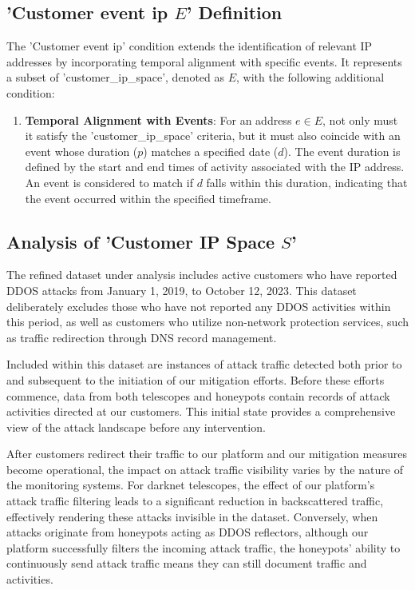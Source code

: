 \subsection{'Customer event ip $E$' Definition}
The 'Customer event ip' condition extends the identification of relevant IP addresses by incorporating temporal alignment with specific events. It represents a subset of 'customer\_ip\_space', denoted as $E$, with the following additional condition:

\begin{enumerate}
    \item \textbf{Temporal Alignment with Events}: For an address $e \in E$, not only must it satisfy the 'customer\_ip\_space' criteria, but it must also coincide with an event whose duration ($p$) matches a specified date ($d$). The event duration is defined by the start and end times of activity associated with the IP address. An event is considered to match if $d$ falls within this duration, indicating that the event occurred within the specified timeframe.
\end{enumerate}

\subsection{Analysis of 'Customer IP Space \(S\)'}
The refined dataset under analysis includes active customers who have reported DDOS attacks from January 1, 2019, to October 12, 2023. This dataset deliberately excludes those who have not reported any DDOS activities within this period, as well as customers who utilize non-network protection services, such as traffic redirection through DNS record management.

Included within this dataset are instances of attack traffic detected both prior to and subsequent to the initiation of our mitigation efforts. Before these efforts commence, data from both telescopes and honeypots contain records of attack activities directed at our customers. This initial state provides a comprehensive view of the attack landscape before any intervention.

After customers redirect their traffic to our platform and our mitigation measures become operational, the impact on attack traffic visibility varies by the nature of the monitoring systems. For darknet telescopes, the effect of our platform's attack traffic filtering leads to a significant reduction in backscattered traffic, effectively rendering these attacks invisible in the dataset. Conversely, when attacks originate from honeypots acting as DDOS reflectors, although our platform successfully filters the incoming attack traffic, the honeypots' ability to continuously send attack traffic means they can still document traffic and activities. 

